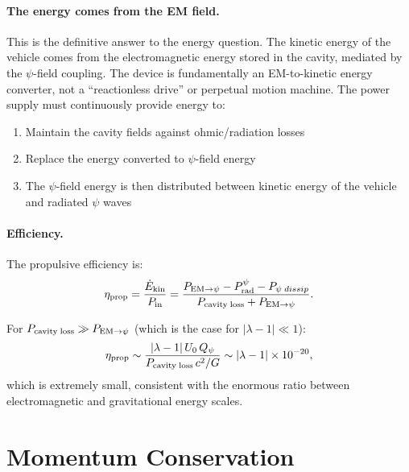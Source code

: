 \documentclass[aps,prd,twocolumn,superscriptaddress,floatfix,nofootinbib]{revtex4-2}
\newcommand{\lam}{\lambda}
\begin{document}
\paragraph{The energy comes from the EM field.} This is the definitive
answer to the energy question. The kinetic energy of the vehicle comes
from the electromagnetic energy stored in the cavity, mediated by the
$\psi$-field coupling. The device is fundamentally an EM-to-kinetic
energy converter, not a ``reactionless drive'' or perpetual motion
machine. The power supply must continuously provide energy to:
\begin{enumerate}[nosep]
\item Maintain the cavity fields against ohmic/radiation losses
\item Replace the energy converted to $\psi$-field energy
\item The $\psi$-field energy is then distributed between kinetic
energy of the vehicle and radiated $\psi$ waves
\end{enumerate}

\paragraph{Efficiency.} The propulsive efficiency is:
\begin{equation}
\eta_{\rm prop} = \frac{\dot{E}_{\rm kin}}{P_{\rm in}}
= \frac{P_{\rm EM\to\psi} - P_{\rm rad}^\psi - P_{\psi\;dissip}}
{P_{\rm cavity\;loss} + P_{\rm EM\to\psi}}.
\label{eq:efficiency}
\end{equation}

For $P_{\rm cavity\;loss} \gg P_{\rm EM\to\psi}$ (which is the case
for $|\lam-1| \ll 1$):
\begin{equation}
\eta_{\rm prop} \sim \frac{|\lam-1|\,U_0\,Q_\psi}
{P_{\rm cavity\;loss}\,c^2/G}
\sim |\lam-1| \times 10^{-20},
\label{eq:efficiency-estimate}
\end{equation}
which is extremely small, consistent with the enormous ratio between
electromagnetic and gravitational energy scales.


\section{Momentum Conservation}\label{sec:momentum}
\end{document}
